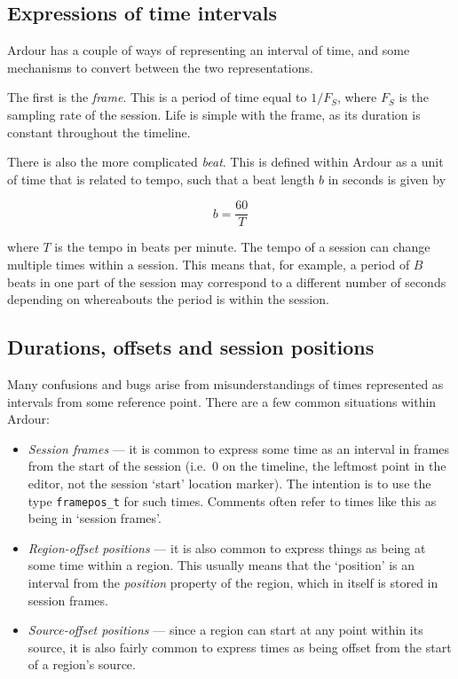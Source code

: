 \documentclass[10pt,a4paper]{book}
\newcommand{\code}[1]{\texttt{#1}}
\begin{document}
\subsection{Expressions of time intervals}

Ardour has a couple of ways of representing an interval of time, and
some mechanisms to convert between the two representations.

The first is the \emph{frame}.  This is a period of time equal to
$1/F_S$, where $F_S$ is the sampling rate of the session.  Life is
simple with the frame, as its duration is constant throughout the
timeline. 

There is also the more complicated \emph{beat}.  This is defined
within Ardour as a unit of time that is related to tempo, such that a
beat length $b$ in seconds is given by

\begin{equation}
b = \frac{60}{T}
\end{equation}

where $T$ is the tempo in beats per minute.  The tempo of a session
can change multiple times within a session.  This means that, for
example, a period of $B$ beats in one part of the session may
correspond to a different number of seconds depending on whereabouts
the period is within the session.


\subsection{Durations, offsets and session positions}

Many confusions and bugs arise from misunderstandings of times
represented as intervals from some reference point.  There are a few common situations within Ardour:

\begin{itemize}
\item \emph{Session frames} --- it is common to express some time as
  an interval in frames from the start of the session (i.e.\ $0$ on
  the timeline, the leftmost point in the editor, not the session
  `start' location marker).  The intention is to use the type
  \code{framepos\_t} for such times.  Comments often refer to times
  like this as being in `session frames'.
\item \emph{Region-offset positions} --- it is also common to express
  things as being at some time within a region.  This usually means
  that the `position' is an interval from the \emph{position} property
  of the region, which in itself is stored in session frames.
\item \emph{Source-offset positions} --- since a region can start at
  any point within its source, it is also fairly common to express
  times as being offset from the start of a region's source.
\end{itemize}
\end{document}
